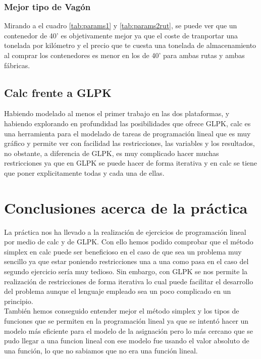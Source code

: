 \documentclass[11pt,spanish]{article}
\begin{document}
			\subsubsection{Mejor tipo de Vagón}
			Mirando a el cuadro \ref{tab:params1} y \ref{tab:params2rut}, se puede ver que un contenedor de 40' es objetivamente mejor ya que el coste de tranportar una tonelada por kilómetro y el precio que te cuesta una tonelada de almacenamiento al comprar los contenedores es menor en los de 40' para ambas rutas y ambas fábricas.
		\subsection{Calc frente a GLPK}
		Habiendo modelado al menos el primer trabajo en las dos plataformas, y habiendo explorando en profundidad las posibilidades que ofrece GLPK, calc es una herramienta para el modelado de tareas de programación lineal que es muy gráfico y permite ver con facilidad las restricciones, las variables y los resultados, no obstante, a diferencia de GLPK, es muy complicado hacer muchas restricciones ya que en GLPK se puede hacer de forma iterativa y en calc se tiene que poner explicitamente todas y cada una de ellas.
		
	\section{Conclusiones acerca de la práctica}
	La práctica nos ha llevado a la realización de ejercicios de programación lineal por medio de calc y de GLPK. Con ello hemos podido comprobar que el método simplex en calc puede ser beneficioso en el caso de que sea un problema muy sencillo ya que estar poniendo restricciones una a una como pasa en el caso del segundo ejercicio sería muy tedioso. Sin embargo, con GLPK se nos permite la realización de restricciones de forma iterativa lo cual puede facilitar el desarrollo del problema aunque el lenguaje empleado sea un poco complicado en un principio.\\
	También hemos conseguido entender mejor el método simplex y los tipos de funciones que se permiten en la programación lineal ya que se intentó hacer un modelo más eficiente para el modelo de la asignación pero lo más cercano que se pudo llegar a una funcion lineal con ese modelo fue usando el valor absoluto de una función, lo que no sabiamos que no era una función lineal.
	\newpage
\end{document}
